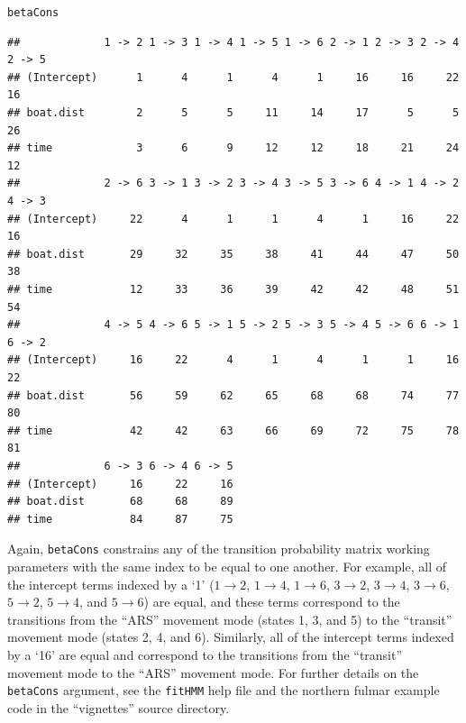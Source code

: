 \documentclass[12pt]{article}\usepackage[]{graphicx}\usepackage[]{xcolor}
\makeatletter
\newcommand{\hldef}[1]{\textcolor[rgb]{0.345,0.345,0.345}{#1}}%
\newenvironment{kframe}{%
 \def\at@end@of@kframe{}%
 \ifinner\ifhmode%
  \def\at@end@of@kframe{\end{minipage}}%
  \begin{minipage}{\columnwidth}%
 \fi\fi%
 \def\FrameCommand##1{\hskip\@totalleftmargin \hskip-\fboxsep
 \colorbox{shadecolor}{##1}\hskip-\fboxsep
     \hskip-\linewidth \hskip-\@totalleftmargin \hskip\columnwidth}%
 \MakeFramed {\advance\hsize-\width
   \@totalleftmargin\z@ \linewidth\hsize
   \@setminipage}}%
 {\par\unskip\endMakeFramed%
 \at@end@of@kframe}
\newenvironment{knitrout}{}{} %
\makeatother
\begin{document}
\begin{knitrout}\small
{}\color{fgcolor}\begin{kframe}
\begin{alltt}
\hldef{betaCons}
\end{alltt}
\begin{verbatim}
##             1 -> 2 1 -> 3 1 -> 4 1 -> 5 1 -> 6 2 -> 1 2 -> 3 2 -> 4 2 -> 5
## (Intercept)      1      4      1      4      1     16     16     22     16
## boat.dist        2      5      5     11     14     17      5      5     26
## time             3      6      9     12     12     18     21     24     12
##             2 -> 6 3 -> 1 3 -> 2 3 -> 4 3 -> 5 3 -> 6 4 -> 1 4 -> 2 4 -> 3
## (Intercept)     22      4      1      1      4      1     16     22     16
## boat.dist       29     32     35     38     41     44     47     50     38
## time            12     33     36     39     42     42     48     51     54
##             4 -> 5 4 -> 6 5 -> 1 5 -> 2 5 -> 3 5 -> 4 5 -> 6 6 -> 1 6 -> 2
## (Intercept)     16     22      4      1      4      1      1     16     22
## boat.dist       56     59     62     65     68     68     74     77     80
## time            42     42     63     66     69     72     75     78     81
##             6 -> 3 6 -> 4 6 -> 5
## (Intercept)     16     22     16
## boat.dist       68     68     89
## time            84     87     75
\end{verbatim}
\end{kframe}
\end{knitrout}
\noindent Again, \verb|betaCons| constrains any of the transition probability matrix working parameters with the same index to be equal to one another. For example, all of the intercept terms indexed by a `1' ($1 \rightarrow 2$, $1 \rightarrow 4$, $1 \rightarrow 6$, $3 \rightarrow 2$, $3 \rightarrow 4$, $3 \rightarrow 6$, $5 \rightarrow 2$, $5 \rightarrow 4$, and $5 \rightarrow 6$) are equal, and these terms correspond to the transitions from the ``ARS'' movement mode (states 1, 3, and 5) to the ``transit'' movement mode (states 2, 4, and 6). Similarly, all of the intercept terms indexed by a `16' are equal and correspond to the transitions from the ``transit'' movement mode to the ``ARS'' movement mode. For further details on the \verb|betaCons| argument, see the \verb|fitHMM| help file and the northern fulmar example code in the ``vignettes'' source directory.
\end{document}
